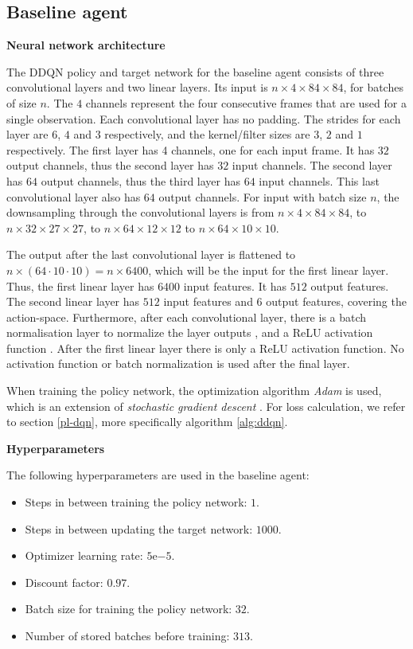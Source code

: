 \subsection{Baseline agent}\label{appendix-baseline-pong}
\textbf{Neural network architecture}\par
\noindent The DDQN policy and target network for the baseline agent consists of three convolutional layers and two linear layers. Its input is $n \times 4 \times 84 \times 84$, for batches of size $n$. The $4$ channels represent the four consecutive frames that are used for a single observation. Each convolutional layer has no padding. The strides for each layer are $6$, $4$ and $3$ respectively, and the kernel/filter sizes are $3$, $2$ and $1$ respectively. The first layer has 4 channels, one for each input frame. It has $32$ output channels, thus the second layer has $32$ input channels. The second layer has $64$ output channels, thus the third layer has $64$ input channels. This last convolutional layer also has $64$ output channels. For input with batch size $n$, the downsampling through the convolutional layers is from $n \times 4 \times 84 \times 84$, to $n \times 32 \times 27 \times 27$, to $n \times 64 \times 12 \times 12$ to $n \times 64 \times 10 \times 10$. 

The output after the last convolutional layer is flattened to $n \times (64 \cdot 10 \cdot 10) = n \times 6400$, which will be the input for the first linear layer. Thus, the first linear layer has $6400$ input features. It has $512$ output features. The second linear layer has $512$ input features and $6$ output features, covering the action-space. Furthermore, after each convolutional layer, there is a batch normalisation layer to normalize the layer outputs \cite{batchnorm}, and a ReLU activation function \cite{relu}. After the first linear layer there is only a ReLU activation function. No activation function or batch normalization is used after the final layer.

When training the policy network, the optimization algorithm \emph{Adam} is used, which is an extension of \emph{stochastic gradient descent} \cite{adam}. For loss calculation, we refer to section \ref{pl-dqn}, more specifically algorithm \ref{alg:ddqn}.\newline

\noindent\textbf{Hyperparameters}\par
\noindent The following hyperparameters are used in the baseline agent:
\begin{itemize}
\item Steps in between training the policy network: $1$.
\item Steps in between updating the target network: $1000$.
\item Optimizer learning rate: $5\mathrm{e}{-5}$.
\item Discount factor: $0.97$.
\item Batch size for training the policy network: $32$.
\item Number of stored batches before training: $313$.
\end{itemize}

